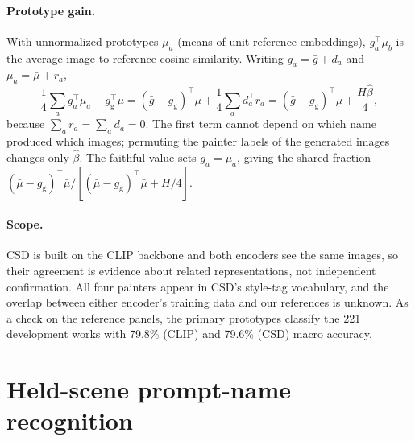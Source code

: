 \paragraph{Prototype gain.} With unnormalized prototypes $\mu_a$ (means of unit reference
embeddings), $g_a^\top\mu_b$ is the average image-to-reference cosine similarity. Writing
$g_a=\bar g+d_a$ and $\mu_a=\bar\mu+r_a$,
\begin{equation}
\frac14\sum_a g_a^\top\mu_a-g_{\mathrm g}^\top\bar\mu
=(\bar g-g_{\mathrm g})^\top\bar\mu+\frac14\sum_a d_a^\top r_a
=(\bar g-g_{\mathrm g})^\top\bar\mu+\frac{H\widehat\beta}{4},
\end{equation}
because $\sum_a r_a=\sum_a d_a=0$. The first term cannot depend on which name produced which
images; permuting the painter labels of the generated images changes only $\widehat\beta$. The
faithful value sets $g_a=\mu_a$, giving the shared fraction $(\bar\mu-g_{\mathrm
g})^\top\bar\mu/[(\bar\mu-g_{\mathrm g})^\top\bar\mu+H/4]$.




\paragraph{Scope.} CSD is built on the CLIP backbone and both encoders see the same images, so
their agreement is evidence about related representations, not independent confirmation. All
four painters appear in CSD's style-tag vocabulary, and the overlap between either encoder's
training data and our references is unknown. As a check on the reference panels, the primary
prototypes classify the 221 development works with 79.8\% (CLIP) and 79.6\% (CSD) macro
accuracy.

\FloatBarrier
\section{Held-scene prompt-name recognition}\label{app:transfer}



